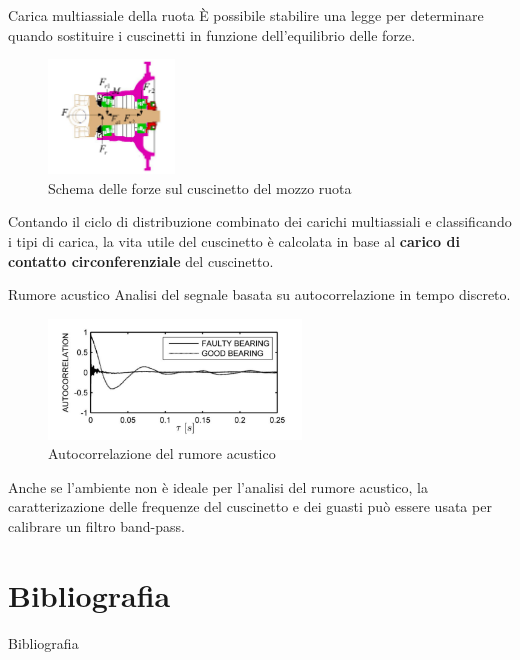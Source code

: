 \documentclass{beamer}
\begin{document}
\begin{frame}{Carica multiassiale della ruota}
    \small
    È possibile stabilire una legge per determinare quando sostituire i cuscinetti in funzione dell'equilibrio delle forze\cite{zhao2021service}.

    \begin{figure}
        \centering
        \includegraphics[width=0.3\textwidth]{Figures/Force_Diagram.png}
        \caption{Schema delle forze sul cuscinetto del mozzo ruota}
        \label{fig:Forces_Bearing}
    \end{figure}

    Contando il ciclo di distribuzione combinato dei carichi multiassiali e classificando i tipi di carica, la vita utile del cuscinetto è calcolata in base al \textbf{carico di contatto circonferenziale} del cuscinetto.
\end{frame}

\begin{frame}{Rumore acustico}
    Analisi del segnale basata su autocorrelazione in tempo discreto.

    \begin{figure}
        \centering
        \includegraphics[width=0.6\textwidth]{Figures/Acoustic.png}
        \caption{Autocorrelazione del rumore acustico}
        \label{fig:acoustic}
    \end{figure}

    Anche se l'ambiente non è ideale per l'analisi del rumore acustico, la caratterizazione delle frequenze del cuscinetto e dei guasti può essere usata per calibrare un filtro band-pass.

\end{frame}

\section*{Bibliografia}

\begin{frame}[allowframebreaks]{Bibliografia}
    \printbibliography
\end{frame}
\end{document}
